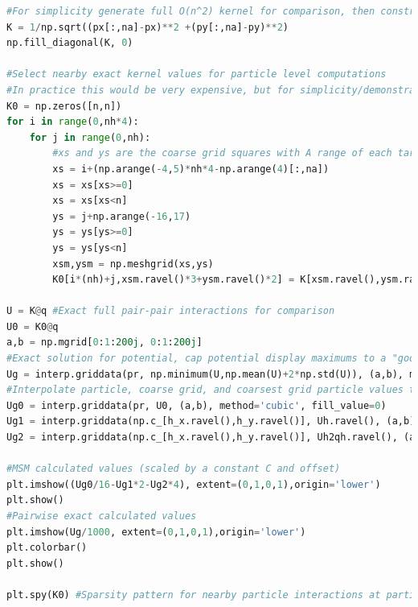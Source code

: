 \documentclass[review]{siamart}
\begin{document}
\begin{lstlisting}[language=Python,basicstyle=\tiny]
#For simplicity generate full O(n^2) kernel for comparison, then construct MSM K0 from this
K = 1/np.sqrt((px[:,na]-px)**2 +(py[:,na]-py)**2)
np.fill_diagonal(K, 0)

#Select nearby exact kernel values for particle level computations
#In practice this would be very expensive, but for simplicity/demonstration it suffices
K0 = np.zeros([n,n])
for i in range(0,nh*4):
    for j in range(0,nh):
        #xs and ys are the coarse grid squares with A range of each target
        xs = i+(np.arange(-4,5)*nh*4-np.arange(4)[:,na])
        xs = xs[xs>=0]
        xs = xs[xs<n]
        ys = j+np.arange(-16,17)
        ys = ys[ys>=0]
        ys = ys[ys<n]
        xsm,ysm = np.meshgrid(xs,ys)
        K0[i*(nh)+j,xsm.ravel()*3+ysm.ravel()*2] = K[xsm.ravel(),ysm.ravel()]

U = K@q #Exact full pair-pair interactions for comparison
U0 = K0@q
a,b = np.mgrid[0:1:200j, 0:1:200j]
#Exact solution for potential, cap potential display maximums to a "good" value to minimize local clustering from dominating plot
Ug = interp.griddata(pr, np.minimum(U,np.mean(U)+2*np.std(U)), (a,b), method='cubic', fill_value=0)
#Interpolate particle, coarse grid, and coarsest grid particle values to a grid for easier plotting
Ug0 = interp.griddata(pr, U0, (a,b), method='cubic', fill_value=0)
Ug1 = interp.griddata(np.c_[h_x.ravel(),h_y.ravel()], Uh.ravel(), (a,b), method='cubic', fill_value=0)
Ug2 = interp.griddata(np.c_[h_x.ravel(),h_y.ravel()], Uh2qh.ravel(), (a,b), method='cubic', fill_value=0)

#MSM calculated values (scaled by a constant C and offset)
plt.imshow((Ug0/16-Ug1*2-Ug2*4), extent=(0,1,0,1),origin='lower')
plt.show()
#Pairwise exact calculated values
plt.imshow(Ug/1000, extent=(0,1,0,1),origin='lower')
plt.colorbar()
plt.show()

plt.spy(K0) #Sparsity pattern for nearby particle interactions at particle level, "kinda" sparse
\end{lstlisting}
\end{document}
